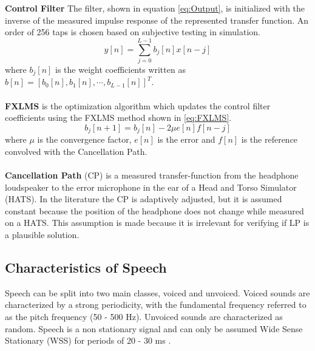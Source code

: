 

\textbf{Control Filter} The filter, shown in equation \ref{eq:Output}, is initialized with the inverse of the measured impulse response of the represented transfer function. An order of 256 taps is chosen based on subjective testing in simulation.
\vspace{-3mm} %
\begin{equation}\label{eq:Output}
y[n]=\sum_{j=0}^{L-1}b_j[n]x[n-j]
\end{equation}
where $b_j[n]$ is the weight coefficients written as  $b[n]=[b_0[n],b_1[n], \cdots, b_{L-1}[n]]^T$.
\\\\
\textbf{FXLMS} is the optimization algorithm which updates the control filter coefficients using the FXLMS method shown in \autoref{eq:FXLMS}.
\begin{equation}\label{eq:FXLMS}
b_j[n+1] = b_j[n] - 2\mu e[n]f[n-j]
\end{equation}
where $\mu$ is the convergence factor, $e[n]$ is the error and $f[n]$ is the reference convolved with the Cancellation Path.
\\\\
\textbf{Cancellation Path} (CP) is a measured transfer-function from the headphone loudspeaker to the error microphone in the ear of a Head and Torso Simulator (HATS). In the literature \cite{Hansen} the CP is adaptively adjusted, but it is assumed constant because the position of the headphone does not change while measured on a HATS. This assumption is made because it is irrelevant for verifying if LP is a plausible solution. 



\subsection{Characteristics of Speech}
Speech can be split into two main classes, voiced and unvoiced. Voiced sounds are characterized by a strong periodicity, with the fundamental frequency referred to as the pitch frequency (50 - 500 Hz). Unvoiced sounds are characterized as random. Speech is a non stationary signal and can only be assumed Wide Sense Stationary (WSS) for periods of 20 - 30 ms \cite{Speech}. 

